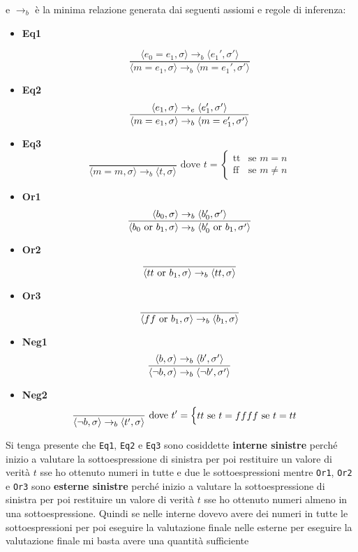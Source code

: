 e $\to_b$ è la minima relazione generata dai seguenti assiomi e regole di inferenza:
\begin{itemize}
    \item \textbf{Eq1} 

    \[
        \frac{\langle e_0 = e_1, \sigma \rangle \to_b \langle e_1', \sigma' \rangle}{\langle m = e_1, \sigma \rangle \to_b \langle m = e_1', \sigma' \rangle}
    \]
    \item \textbf{Eq2}
    \[
        \frac{\langle e_1, \sigma \rangle\to_e\langle e_1',\sigma' \rangle}{\langle m = e_1, \sigma \rangle \to_b \langle m = e_1', \sigma' \rangle}
    \]
    \item \textbf{Eq3}
    \[  
        \frac{}
        {\langle m = m, \sigma \rangle \to_b \langle t, \sigma \rangle} \text{ dove } t = \begin{cases} 
            \text{tt} & \text{se } m = n \\
            \text{ff} & \text{se } m \neq n 
        \end{cases}  
    \]
    \item \textbf{Or1}
    \[
        \frac{\langle b_0,\sigma \rangle\to_b\langle b_0',\sigma' \rangle}{\langle b_0 \text{ or }b_1,\sigma \rangle \to_b \langle b_0' \text{ or }b_1, \sigma' \rangle}  
    \]
    \item \textbf{Or2}
    \[
        \frac{}{\langle tt \text{ or }b_1, \sigma \rangle\to_b\langle tt, \sigma \rangle}    
    \]
    \item \textbf{Or3}
    \[
        \frac{}{\langle ff \text{ or } b_1, \sigma \rangle\to_b \langle b_1,\sigma \rangle}    
    \]
    \item \textbf{Neg1}
    \[
        \frac{\langle b,\sigma \rangle\to_b\langle b', \sigma' \rangle}{\langle \lnot b, \sigma \rangle\to_b\langle \lnot b', \sigma' \rangle}    
    \]
    \item \textbf{Neg2}
    \[
        \frac{}{\langle \lnot b, \sigma \rangle\to_b\langle t', \sigma \rangle}\text{ dove }t' = \begin{cases}
            tt \text{ se }t=ff
            ff \text{ se }t=tt
        \end{cases}  
    \]
\end{itemize}

Si tenga presente che \texttt{Eq1}, \texttt{Eq2} e \texttt{Eq3} sono cosiddette \textbf{interne sinistre} perché inizio a valutare la sottoespressione di sinistra per poi restituire un valore di verità $t$ sse ho ottenuto numeri in tutte e due le sottoespressioni mentre  \texttt{Or1}, \texttt{Or2} e \texttt{Or3} sono \textbf{esterne sinistre} perché inizio a valutare la sottoespressione di sinistra per poi restituire un valore di verità $t$ sse ho ottenuto numeri almeno in una sottoespressione. Quindi se nelle interne dovevo avere dei numeri in tutte le sottoespressioni per poi eseguire la valutazione finale nelle esterne per eseguire la valutazione finale mi basta avere una quantità sufficiente

